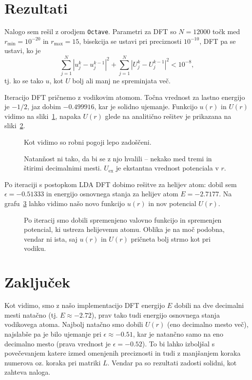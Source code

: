 \documentclass[12pt, a4 paper]{article}
\begin{document}
\section{Rezultati}

Nalogo sem re\v sil z orodjem \texttt{Octave}. Parametri za DFT so $N = 12000$ to\v ck med $r_\text{min} = 10^{-20}$ in
$r_\text{max} = 15$, bisekcija se ustavi pri preciznosti $10^{-10}$, DFT pa se ustavi, ko je
\[
	\sum_{j = 1}^N |u_j^k - u_j^{k-1}|^2 + \sum_{j=1}^N |U_j^k - U_j^{k-1}|^2 < 10^{-8},
\]
tj. ko se tako $u$, kot $U$ bolj ali manj ne spreminjata ve\v c.

Iteracijo DFT pri\v cnemo z vodikovim atomom. To\v cna vrednost za lastno energijo je $-1/2$, jaz dobim $-0.499916$, kar
je solidno ujemanje. Funkcijo $u(r)$ in $U(r)$ vidimo na sliki~\ref{gr1}, napaka $U(r)$ glede na analiti\v cno re\v sitev je
prikazana na sliki~\ref{gr2}.

\begin{figure}[H]\centering
	
	\caption{Kot vidimo so robni pogoji lepo zado\v s\v ceni.}
	\label{gr1}
\end{figure}

\begin{figure}[H]\centering
	
	\caption{Natan\v nost ni tako, da bi se z njo hvalili -- nekako med tremi in \v stirimi decimalnimi mesti.
		$U_\text{ex}$ je ekstantna vrednost potenciala v $r$.}
	\label{gr2}
\end{figure}

Po iteraciji s postopkom LDA DFT dobimo re\v sitve za helijev atom: dobil sem $\epsilon = -0.51333$ in energijo osnovnega
stanja za helijev atom $E = -2.7177$. Na grafu~\ref{gr3} lahko vidimo na\v so novo funkcijo $u(r)$ in nov potencial $U(r)$.

\begin{figure}[H]\centering
	
	\caption{Po iteracij smo dobili spremenjeno valovno funkcijo in spremenjen potencial, ki ustreza helijevemu
		atomu. Oblika je na mo\v c podobna, vendar ni ista, saj $u(r)$ in $U(r)$ pri\v cneta bolj strmo kot
		pri vodiku.}
	\label{gr3}
\end{figure}

\section{Zaklju\v cek}
Kot vidimo, smo z na\v so implementacijo DFT energijo $E$ dobili na dve decimalni mesti nata\v cno (tj. $E \approx -2.72$),
prav tako tudi energijo osnovnega stanja vodikovega atoma. Najbolj nata\v cno smo dobili $U(r)$ (eno decimalno mesto ve\v c),
najslab\v se pa je bilo ujemanje pri $\epsilon \approx -0.51$, kar je natan\v cno samo na eno decimalno mesto (prava vrednost
je $\epsilon = -0.52$). To bi lahko izbolj\v sal s pove\v cevanjem katere izmed omenjenih preciznosti in tudi z manj\v sanjem
koraka numerova oz. koraka pri matriki $L$. Vendar pa so rezultati zadosti solidni, kot zahteva naloga.
\end{document}
